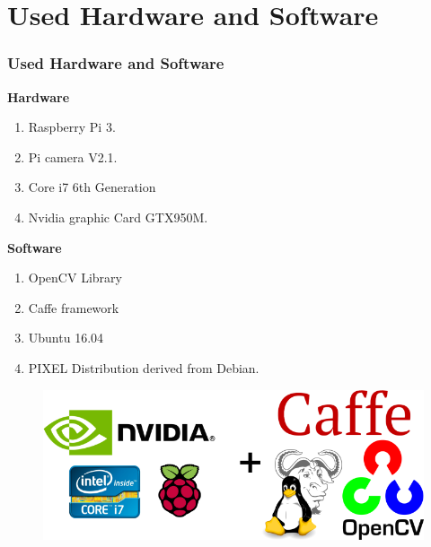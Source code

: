 \documentclass[10pt,a4paper]{beamer}
\begin{document}
\section{Used Hardware and Software}
\begin{frame}
\frametitle{Used Hardware and Software}
\textbf{Hardware}
\begin{enumerate}
\item Raspberry Pi 3.
\item Pi camera V2.1.
\item Core i7 6th Generation
\item Nvidia graphic Card GTX950M.
\end{enumerate}
\textbf{Software}
\begin{enumerate}
\item OpenCV Library
\item Caffe framework
\item Ubuntu 16.04
\item PIXEL Distribution derived from Debian.
\end{enumerate}
\begin{figure}[hbtp]
\centering
\includegraphics[scale=0.3]{SoftHard.png}
\end{figure}

\end{frame}
\end{document}
